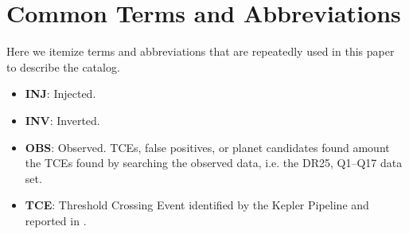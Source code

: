 \section{Common Terms and Abbreviations}
\label{abbrev}
Here we itemize terms and abbreviations that are repeatedly used in this paper to describe the catalog.

\begin{itemize}

\item[] \textbf{INJ}: Injected.
\item[] \textbf{INV}: Inverted.
\item[] \textbf{OBS}: Observed. TCEs, false positives, or planet candidates found amount the TCEs found by searching the observed data, i.e. the DR25, Q1--Q17 data set.
\item[] \textbf{TCE}: Threshold Crossing Event identified by the Kepler Pipeline and reported in \citet{Twicken2016}.

\end{itemize}

